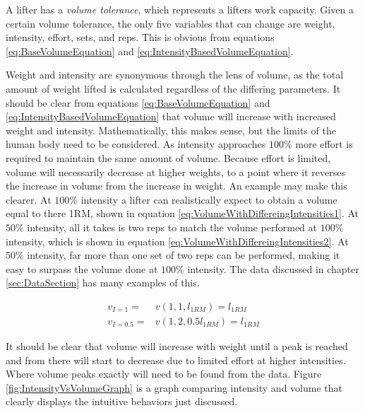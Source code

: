 A lifter has a \textit{volume tolerance}, which represents a lifters work capacity. Given a certain volume tolerance, the only five variables that can change are weight, intensity, effort, sets, and reps. This is obvious from equations \ref{eq:BaseVolumeEquation} and \ref{eq:IntensityBasedVolumeEquation}.

Weight and intensity are synonymous through the lens of volume, as the total amount of weight lifted is calculated regardless of the differing parameters. It should be clear from equations \ref{eq:BaseVolumeEquation} and \ref{eq:IntensityBasedVolumeEquation} that volume will increase with increased weight and intensity. Mathematically, this makes sense, but the limits of the human body need to be considered. As intensity approaches $100\%$ more effort is required to maintain the same amount of volume. Because effort is limited, volume will necessarily decrease at higher weights, to a point where it reverses the increase in volume from the increase in weight. An example may make this clearer. At $100\%$ intensity a lifter can realistically expect to obtain a volume equal to there 1RM, shown in equation \ref{eq:VolumeWithDiffereingIntensities1}. At $50\%$ intensity, all it takes is two reps to match the volume performed at $100\%$ intensity, which is shown in equation \ref{eq:VolumeWithDiffereingIntensities2}. At $50\%$ intensity, far more than one set of two reps can be performed, making it easy to surpass the volume done at $100\%$ intensity. The data discussed in chapter \ref{sec:DataSection} has many examples of this.

\begin{subequations}
    \begin{align}
        \label{eq:VolumeWithDiffereingIntensities1}
        v_{I=1}=&v(1,1,l_{1RM})=l_{1RM} \\
        \label{eq:VolumeWithDiffereingIntensities2}
        v_{I=0.5}=&v(1,2,0.5l_{1RM})=l_{1RM}
    \end{align}
\end{subequations}

It should be clear that volume will increase with weight until a peak is reached and from there will start to decrease due to limited effort at higher intensities. Where volume peaks exactly will need to be found from the data. Figure \ref{fig:IntensityVsVolumeGraph} is a graph comparing intensity and volume that clearly displays the intuitive behaviors just discussed.


